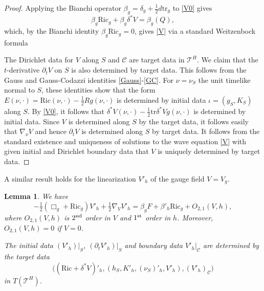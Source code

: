 \documentclass[10pt]{amsart}
\renewcommand{\b}{\beta}
\renewcommand{\d}{\delta}
\newcommand{\cC}{{\mathcal C}}
\newcommand{\cT}{{\mathcal T}}
\newcommand{\Ric}{\mathrm{Ric}}
\newcommand{\be}{\begin{equation}}
\newcommand{\ee}{\end{equation}}
\newcommand{\tr}{\mathrm{tr}}
\newcommand{\p}{\partial}
\newcommand{\<}{\langle}
\renewcommand{\>}{\rangle}
\theoremstyle{plain}
\newtheorem{lemma}{Lemma}[section]
\theoremstyle{remark}
\theoremstyle{definition}
\numberwithin{equation}{section}
\begin{document}
\begin{proof}
Applying the Bianchi operator $\b_g = \d_g + \frac{1}{2}d \tr_g$ to \eqref{V0} gives 
\be \label{V2}
\b_g \Ric_g + \b_g \d^*V = \b_g(Q),
\ee
which, by the Bianchi identity $\b_g \Ric_g = 0$, gives \eqref{V} via a standard Weitzenbock formula 

The Dirichlet data for $V$ along $S$ and $\cC$ are target data in $\cT^H$. We claim that the $t$-derivative $\p_t V$ on $S$ is also 
determined by target data. This follows from the Gauss and Gauss-Codazzi identities \eqref{Gauss}-\eqref{GC}. For $\nu = \nu_S$ the 
unit timelike normal to $S$, these identities show that the form $E(\nu, \cdot) = \Ric(\nu, \cdot) - \frac{1}{2}R g(\nu, \cdot)$ is determined by 
initial data $\iota = (g_S, K_S)$ along $S$. By \eqref{V0}, it follows that $\d^*V(\nu, \cdot) - \frac{1}{2}\tr \d^*V g(\nu, \cdot)$ is determined by 
initial data. Since $V$ is determined along $S$ by the target data, it follows easily that $\nabla_{\nu}V$ and hence $\p_t V$ is determined 
along $S$ by target data. It follows from the standard existence and uniqueness of solutions to the wave equation \eqref{V} with given initial 
and Dirichlet boundary data that $V$ is uniquely determined by target data. 

\end{proof}

 A similar result holds for the linearization $V'_h$ of the gauge field $V = V_g$. 
\begin{lemma}\label{Gauge-lemma2}
We have 
\be \label{V'}
-\tfrac{1}{2}(\Box_g + \Ric_g)V'_h + \tfrac{1}{2}\nabla_V V'_h = \b_g F + \b'_h \Ric_g + O_{2,1}(V,h),
\ee
where $O_{2,1}(V,h)$ is $2^{\rm nd}$ order in $V$ and $1^{\rm st}$ order in $h$. Moreover, $O_{2,1}(V,h) = 0$ if $V = 0$. 

  The initial data $(V'_h)|_S$, $(\p_t V'_h)|_S$ and boundary data $V'_h|_{\cC}$ are determined by the target data  
$$\big((\Ric + \d^*V)'_h, (h_S, K'_h, (\nu_S)'_h, V'_h), (V'_h)_{\cC}\big)$$
in $T(\cT^H)$.
\end{lemma}
\end{document}

